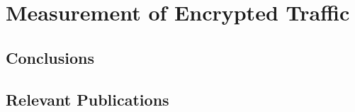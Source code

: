\chapter{Measurement of Encrypted Traffic} \label{chap:measurement-of-encrypted-traffic}

\section{Conclusions}

\section{Relevant Publications}
